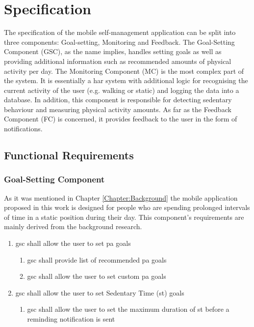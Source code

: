 \chapter{Specification}
\label{Chapter:Specification}

The specification of the mobile self-management application can be split into three components: Goal-setting, Monitoring and Feedback. The Goal-Setting Component (GSC), as the name implies, handles setting goals as well as providing additional information such as recommended amounts of physical activity per day. The Monitoring Component (MC) is the most complex part of the system. It is essentially a \gls{har} system with additional logic for recognising the current activity of the user (e.g. walking or static) and logging the data into a database. In addition, this component is responsible for detecting sedentary behaviour and measuring physical activity amounts. As far as the Feedback Component (FC) is concerned, it provides feedback to the user in the form of notifications. 
\section{Functional Requirements}

    \subsection{Goal-Setting Component}
    As it was mentioned in Chapter \ref{Chapter:Background} the mobile application proposed in this work is designed for people who are spending prolonged intervals of time in a static position during their day. This component's requirements are mainly derived from the background research. 
    
    \begin{enumerate}
        \item \gls{gsc} shall allow the user to set \gls{pa} goals
        \begin{enumerate}
            \item \gls{gsc} shall provide list of recommended \gls{pa} goals
            \item \gls{gsc} shall allow the user to set custom \gls{pa} goals
        \end{enumerate}
        \item \gls{gsc} shall allow the user to set Sedentary Time (\gls{st}) goals
        \begin{enumerate}
            \item \gls{gsc} shall allow the user to set the maximum duration of \gls{st} before a reminding notification is sent 
        \end{enumerate}
    \end{enumerate}
    
